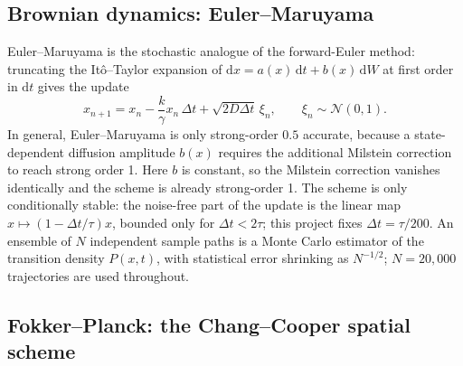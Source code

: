 \documentclass[11pt]{article}
\newcommand{\dd}{\mathrm{d}}
\begin{document}
\subsection{Brownian dynamics: Euler--Maruyama}

Euler--Maruyama is the stochastic analogue of the forward-Euler method: truncating the It\^o--Taylor expansion of $\dd x = a(x)\,\dd t + b(x)\,\dd W$ at first order in $\dd t$ gives the update
\begin{equation}
x_{n+1} = x_n - \frac{k}{\gamma}x_n\,\Delta t + \sqrt{2D\Delta t}\,\xi_n, \qquad \xi_n \sim \mathcal{N}(0,1).
\label{eq:em-update}
\end{equation}
In general, Euler--Maruyama is only strong-order $0.5$ accurate, because a state-dependent diffusion amplitude $b(x)$ requires the additional Milstein correction to reach strong order 1. Here $b$ is constant, so the Milstein correction vanishes identically and the scheme is already strong-order 1. The scheme is only conditionally stable: the noise-free part of the update is the linear map $x \mapsto (1-\Delta t/\tau)x$, bounded only for $\Delta t < 2\tau$; this project fixes $\Delta t = \tau/200$. An ensemble of $N$ independent sample paths is a Monte Carlo estimator of the transition density $P(x,t)$, with statistical error shrinking as $N^{-1/2}$; $N=20{,}000$ trajectories are used throughout.

\subsection{Fokker--Planck: the Chang--Cooper spatial scheme}
\label{sec:chang-cooper}
\end{document}
